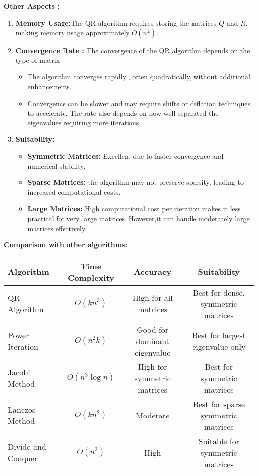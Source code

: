 \documentclass[journal,12pt,onecolumn]{IEEEtran}
\theoremstyle{remark}
\begin{document}
\textbf{Other Aspects :}
\begin{enumerate}
    \item \textbf{Memory Usage:}The QR algorithm requires storing the matrices $Q$ and $R$, making memory usage approximately $O(n^2)$.\\

    \item \textbf{Convergence Rate :} The convergence of the QR algorithm depends on the type of matrix 
    \begin{itemize}
        \item The algorithm converges rapidly , often quadratically, without additional enhancements.

        \item Convergence can be slower and may require shifts or deflation techniques to accelerate. The rate also depends on how well-separated the eigenvalues requiring more iterations.\\
        
    \end{itemize}

    \item \textbf{Suitability:}
    \begin{itemize}
        \item \textbf{Symmetric Matrices:} Excellent due to faster convergence and numerical stability.

        \item \textbf{Sparse Matrices:} the algorithm may not preserve sparsity, leading to increased computational costs.

        \item \textbf{Large Matrices:} High computational cost per iteration makes it less practical for very large matrices. However,it can handle moderately large matrices effectively.
    \end{itemize}
\end{enumerate} 

\newpage
\textbf{Comparison with other algorithms:}
 \begin{table}[ht]
\centering
\begin{tabular}{|l|c|c|c|}
\hline
\textbf{Algorithm} & \textbf{Time Complexity} & \textbf{Accuracy} & \textbf{Suitability} \\ 
\hline
QR Algorithm & $O(kn^3)$ & High for all matrices & Best for dense, symmetric matrices \\ 
Power Iteration & $O(n^2k)$ & Good for dominant eigenvalue & Best for largest eigenvalue only \\ 
Jacobi Method & $O(n^3 \log n)$ & High for symmetric matrices & Best for symmetric matrices \\ 
Lanczos Method & $O(kn^2)$ & Moderate & Best for sparse symmetric matrices \\ 
Divide and Conquer & $O(n^3)$ & High & Suitable for symmetric matrices \\ 
\hline 
\end{tabular}
\end{table} \\
\end{document}
